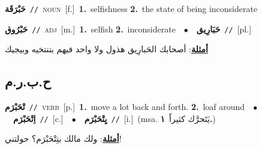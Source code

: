 \documentclass[10pt,a4paper,twoside]{article} %
\begin{document}
\begin{multicols}{2}
{\setlength\topsep{0pt}\textbf{\foreignlanguage{arabic}{حَبْرَقَة}}\ {\color{gray}\texttt{//}\color{black}}\ \textsc{noun}\ [f.]\ \textbf{1.}~selfishness  \textbf{2.}~the state of being inconsiderate\ } \vspace{2mm}

{\setlength\topsep{0pt}\textbf{\foreignlanguage{arabic}{حَبْرُوق}}\ {\color{gray}\texttt{//}\color{black}}\ \textsc{adj}\ [m.]\ \textbf{1.}~selfish  \textbf{2.}~inconsiderate\ \ $\bullet$\ \ \setlength\topsep{0pt}\textbf{\foreignlanguage{arabic}{حَبَارِيق}}\ {\color{gray}\texttt{//}\color{black}}\ [pl.]\  \begin{flushright}\color{gray}\foreignlanguage{arabic}{\textbf{\underline{\foreignlanguage{arabic}{أمثلة}}}: أصحابك الحَبارِيق هذول ولا واحد فيهم بتنتخيه وبيجيك}\end{flushright}\color{black}} \vspace{2mm}

\vspace{-3mm}
\subsection*{\color{blue}\foreignlanguage{arabic}{ح.ب.ر.م}\color{blue}{}} 

{\setlength\topsep{0pt}\textbf{\foreignlanguage{arabic}{تْحَبْرَم}}\ {\color{gray}\texttt{//}\color{black}}\ \textsc{verb}\ [p.]\ \textbf{1.}~move a lot back and forth.  \textbf{2.}~loaf around\ \ $\bullet$\ \ \setlength\topsep{0pt}\textbf{\foreignlanguage{arabic}{اِتْحَبْرَم}}\ {\color{gray}\texttt{//}\color{black}}\ [c.]\ \ $\bullet$\ \ \setlength\topsep{0pt}\textbf{\foreignlanguage{arabic}{يِتْحَبْرَم}}\ {\color{gray}\texttt{//}\color{black}}\ [i.]\ \color{gray}(msa. \foreignlanguage{arabic}{يَتَحرَّك كثيراً}~\foreignlanguage{arabic}{\textbf{١.}})\color{black}\  \begin{flushright}\color{gray}\foreignlanguage{arabic}{\textbf{\underline{\foreignlanguage{arabic}{أمثلة}}}: ولك مالك بتِتْحَبْرَم؟ حولتني!}\end{flushright}\color{black}} \vspace{2mm}


\end{multicols}
\end{document}
